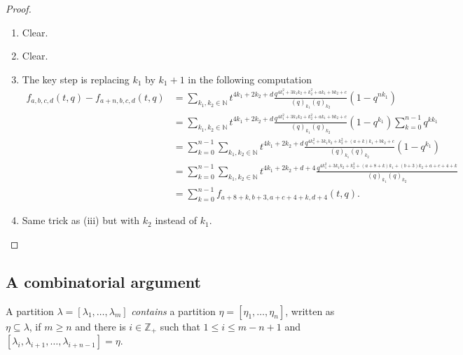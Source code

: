 \documentclass[a4paper, 12pt, reqno]{amsart}
\theoremstyle{remark}
\numberwithin{equation}{subsection}
\begin{document}
\begin{proof}\leavevmode
  \begin{enumerate}
  \item Clear.
  \item Clear.
  \item The key step is replacing $k_1$ by $k_1 + 1$ in the following computation
    \begin{align*}
      f_{a, b, c, d}(t, q) - f_{a + n, b, c, d}(t, q) &= \sum_{k_1, k_2 \in \mathbb{N}}t^{4k_1 + 2k_2 + d}\frac{q^{4k_1^2 + 3k_1k_2 + k_2^2 + ak_1 + bk_2 + c}}{(q)_{k_1}(q)_{k_2}}(1 - q^{nk_1}) \\
      &= \sum_{k_1, k_2 \in \mathbb{N}}t^{4k_1 + 2k_2 + d}\frac{q^{4k_1^2 + 3k_1k_2 + k_2^2 + ak_1 + bk_2 + c}}{(q)_{k_1}(q)_{k_2}}(1 - q^{k_1})\sum_{k = 0}^{n - 1}q^{kk_1} \\
      &= \sum_{k = 0}^{n - 1}\sum_{k_1, k_2 \in \mathbb{N}}t^{4k_1 + 2k_2 + d}\frac{q^{4k_1^2 + 3k_1k_2 + k_2^2 + (a + k)k_1 + bk_2 + c}}{(q)_{k_1}(q)_{k_2}}(1 - q^{k_1}) \\
      &= \sum_{k = 0}^{n - 1}\sum_{k_1, k_2 \in \mathbb{N}}t^{4k_1 + 2k_2 + d + 4}\frac{q^{4k_1^2 + 3k_1k_2 + k_2^2 + (a + 8 + k)k_1 + (b + 3)k_2 + a + c + 4 + k}}{(q)_{k_1}(q)_{k_2}} \\
      &= \sum_{k = 0}^{n - 1}f_{a + 8 + k, b + 3, a + c + 4 + k, d + 4}(t, q).
    \end{align*}
  \item Same trick as (iii) but with $k_2$ instead of $k_1$. \qedhere
  \end{enumerate}
\end{proof}

\subsection{A combinatorial argument}
\label{sec:comb-argum}

A partition $\lambda = [\lambda_1, \dots, \lambda_m]$ \emph{contains} a partition $\eta = [\eta_1, \dots, \eta_n]$, written as $\eta \subseteq \lambda$, if $m \ge n$ and there is $i \in \mathbb{Z}_+$ such that $1 \le i \le m - n + 1$ and $[\lambda_i, \lambda_{i + 1}, \dots, \lambda_{i + n - 1}] = \eta$.
\end{document}
